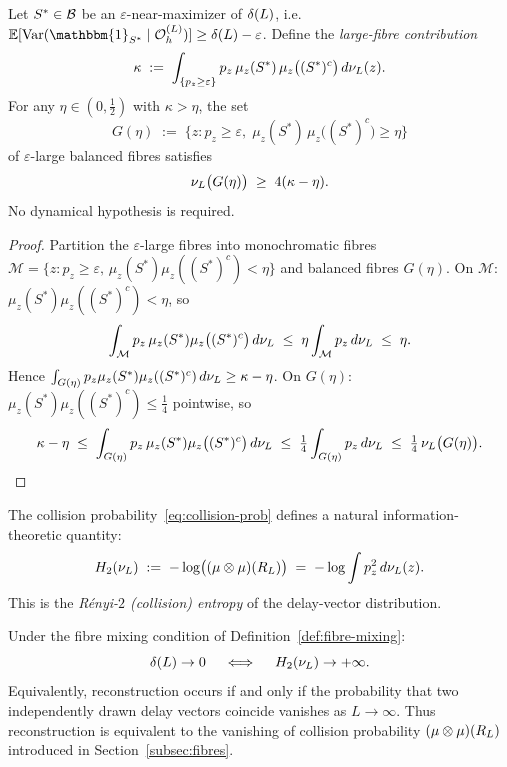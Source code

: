 \begin{lemma}
\label{lem:balance}
Let $S^* \in \mathcal{B}$ be an $\varepsilon$-near-maximizer of $\delta(L)$, i.e.\
$\mathbb{E}[\mathrm{Var}(\mathbbm{1}_{S^*} \mid \OhL)] \geq \deltaL - \varepsilon$.
Define the \emph{large-fibre contribution}
\[
  \kappa \;:=\; \int_{\{p_z \geq \varepsilon\}}
    p_z\,\mu_z(S^*)\,\mu_z\bigl((S^*)^c\bigr)\,d\nu_L(z).
\]
For any $\eta \in (0,\tfrac{1}{2})$ with $\kappa > \eta$, the set
\[
  G(\eta) \;:=\; \bigl\{z : p_z \geq \varepsilon,\;
    \mu_z(S^*)\,\mu_z\bigl((S^*)^c\bigr) \geq \eta\bigr\}
\]
of $\varepsilon$-large balanced fibres satisfies
\[
  \nu_L\bigl(G(\eta)\bigr) \;\geq\; 4(\kappa - \eta).
\]
No dynamical hypothesis is required.
\end{lemma}

\begin{proof}
Partition the $\varepsilon$-large fibres into monochromatic fibres
$\mathcal{M} = \{z : p_z \geq \varepsilon,\, \mu_z(S^*)\mu_z((S^*)^c) < \eta\}$
and balanced fibres $G(\eta)$.
On $\mathcal{M}$: $\mu_z(S^*)\mu_z((S^*)^c) < \eta$, so
\[
  \int_{\mathcal{M}} p_z\,\mu_z(S^*)\mu_z\bigl((S^*)^c\bigr)\,d\nu_L
  \;\leq\; \eta\int_{\mathcal{M}} p_z\,d\nu_L \;\leq\; \eta.
\]
Hence $\int_{G(\eta)} p_z\mu_z(S^*)\mu_z((S^*)^c)\,d\nu_L \geq \kappa - \eta$.
On $G(\eta)$: $\mu_z(S^*)\mu_z((S^*)^c) \leq \tfrac{1}{4}$ pointwise, so
\[
  \kappa - \eta
  \;\leq\; \int_{G(\eta)} p_z\,\mu_z(S^*)\mu_z\bigl((S^*)^c\bigr)\,d\nu_L
  \;\leq\; \tfrac{1}{4}\int_{G(\eta)} p_z\,d\nu_L
  \;\leq\; \tfrac{1}{4}\,\nu_L\bigl(G(\eta)\bigr). \qedhere
\]
\end{proof}

The collision probability~\eqref{eq:collision-prob} defines a natural
information-theoretic quantity:
\begin{equation}
  H_2(\nu_L) \;:=\; -\log\bigl((\mu \otimes \mu)(R_L)\bigr)
  \;=\; -\log \int p_z^2\,d\nu_L(z).
  \label{eq:entropy}
\end{equation}
This is the \emph{Rényi-$2$ (collision) entropy} of the delay-vector distribution.

\begin{corollary}
\label{cor:entropy}
Under the fibre mixing condition of Definition~\ref{def:fibre-mixing}:
\[
  \delta(L) \to 0
  \quad\iff\quad
  H_2(\nu_L) \to +\infty.
\]
Equivalently, reconstruction occurs if and only if the probability that two
independently drawn delay vectors coincide vanishes as $L \to \infty$.
Thus reconstruction is equivalent to the vanishing of collision probability
$(\mu \otimes \mu)(R_L)$ introduced in Section~\ref{subsec:fibres}.
\end{corollary}

